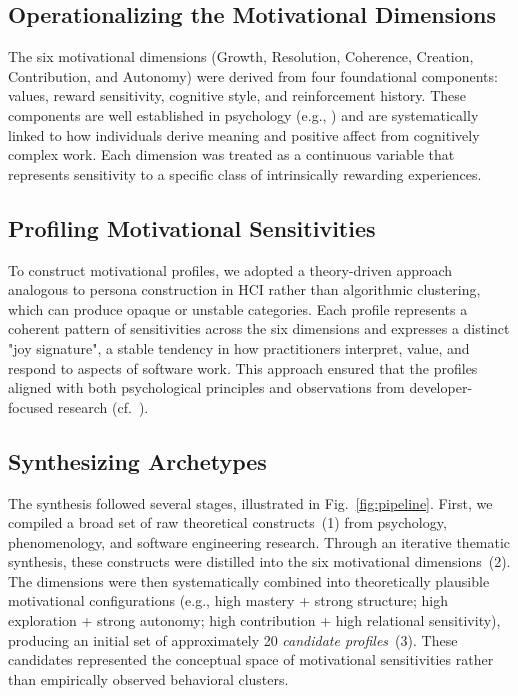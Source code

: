 \documentclass[12pt]{elsarticle}
\begin{document}
\subsection{Operationalizing the Motivational Dimensions}
The six motivational dimensions (Growth, Resolution, Coherence, Creation, 
Contribution, and Autonomy) were derived from four foundational components: 
values, reward sensitivity, cognitive style, and reinforcement history. These 
components are well established in psychology (e.g., \cite{deci1985intrinsic, 
kozhevnikov2007cognitive}) and are systematically linked to how individuals 
derive meaning and positive affect from cognitively complex work. Each dimension 
was treated as a continuous variable that represents sensitivity to a specific 
class of intrinsically rewarding experiences.

\subsection{Profiling Motivational Sensitivities}
To construct motivational profiles, we adopted a theory-driven approach 
analogous to persona construction in HCI rather than algorithmic clustering, 
which can produce opaque or unstable categories. Each profile represents a 
coherent pattern of sensitivities across the six dimensions and expresses a 
distinct "joy signature", a stable tendency in how practitioners interpret, 
value, and respond to aspects of software work. This approach ensured that the 
profiles aligned with both psychological principles and observations from 
developer-focused research (cf.~\cite{ford2015exploring}).

\subsection{Synthesizing Archetypes}
The synthesis followed several stages, illustrated in Fig.~\ref{fig:pipeline}. 
First, we compiled a broad set of raw theoretical constructs~(1) from 
psychology, phenomenology, and software engineering research. Through an iterative 
thematic synthesis, these constructs were distilled into the six motivational 
dimensions~(2). The dimensions were then systematically combined into 
theoretically plausible motivational configurations (e.g., high mastery + strong 
structure; high exploration + strong autonomy; high contribution + high 
relational sensitivity), producing an initial set of approximately 20 
\emph{candidate profiles}~(3). These candidates represented the conceptual space 
of motivational sensitivities rather than empirically observed behavioral 
clusters.
\end{document}
